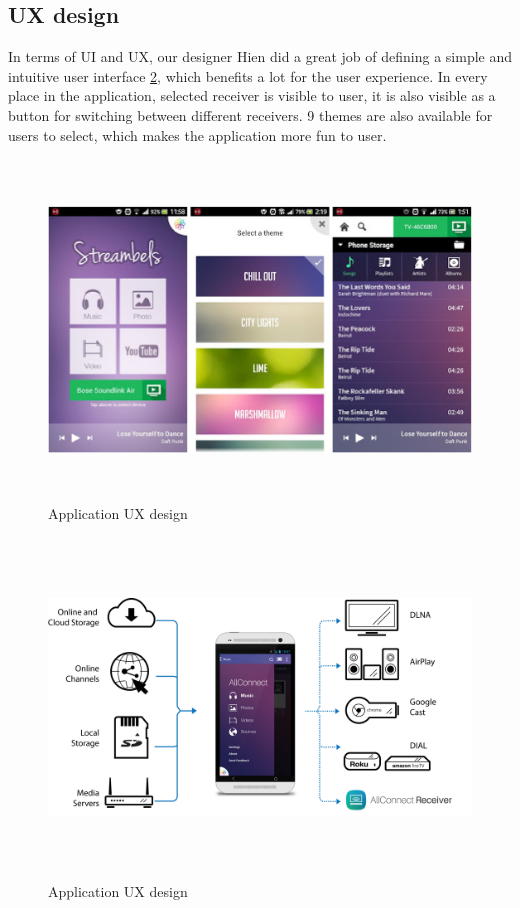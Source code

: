 \subsection{UX design}
In terms of UI and UX, our designer Hien did a great job of defining a simple
and intuitive user interface \ref{chart5}, which benefits a lot for the user
experience.
In every place in the application, selected receiver is visible to user, it is also
visible as a button for switching between different receivers. 9 themes are also
available for users to select, which makes the application more fun to user.
\begin{figure}[htb]
\centering \includegraphics[height=9cm]{charts/streambels_ui}
\caption{Application UX design \label{chart5}}
\end{figure}

\begin{figure}[htb]
\centering \includegraphics[height=9cm]{charts/allconnect-app}
\caption{Application UX design \label{chart5}}
\end{figure}

